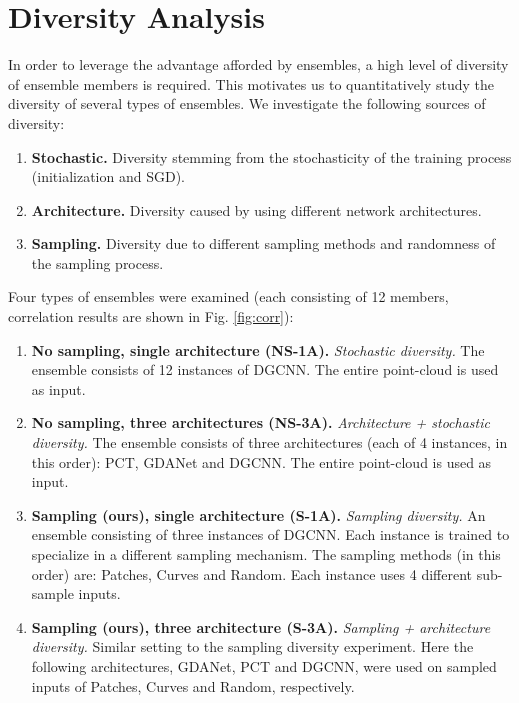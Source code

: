 \documentclass[10pt,twocolumn]{article}
\begin{document}
\section{Diversity Analysis}
\label{sec:analysis}
In order to leverage the advantage afforded by ensembles, a high level of diversity of ensemble members is required. This motivates us to quantitatively study the diversity of several types of ensembles. We investigate the following sources of diversity:
\begin{enumerate}
    \item {\bf Stochastic.} Diversity stemming from the stochasticity of the training process (initialization and SGD).
    \item {\bf Architecture.} Diversity caused by using different network architectures.
    \item {\bf Sampling.} Diversity due to different sampling methods and randomness of the sampling process.
\end{enumerate}
Four types of ensembles were examined (each consisting of 12 members, correlation results are shown in Fig. \ref{fig:corr}):
\begin{enumerate}
    \item {\bf No sampling, single architecture (NS-1A).} \emph{Stochastic diversity.} The ensemble consists of   12 instances of DGCNN\cite{dgcnn}. The entire point-cloud is used as input.
    \item {\bf No sampling, three architectures (NS-3A).} \emph{Architecture + stochastic diversity.}
    The ensemble consists of three architectures (each of 4 instances, in this order): PCT\cite{pct}, GDANet\cite{gdanet} and DGCNN\cite{dgcnn}. The entire point-cloud is used as input.
    \item {\bf Sampling (ours), single architecture (S-1A).} 
    \emph{Sampling diversity.}
    An ensemble consisting of three instances of DGCNN\cite{dgcnn}. Each instance is trained to specialize in a different sampling mechanism. The sampling methods (in this order) are: Patches, Curves and Random. Each instance uses 4 different sub-sample inputs.
    \item {\bf Sampling (ours), three architecture (S-3A).} 
    \emph{Sampling + architecture diversity.}
    Similar setting to the sampling diversity experiment. Here the following architectures, GDANet\cite{gdanet}, PCT\cite{pct} and DGCNN\cite{dgcnn}, were used on sampled inputs of Patches, Curves and Random, respectively. 
\end{enumerate}
\end{document}
